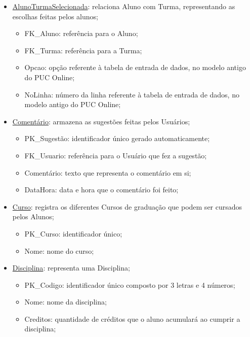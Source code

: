 \documentclass[graduacao,brazil]{ThesisPUC}
\begin{document}
\begin{itemize}
	\item \underline{AlunoTurmaSelecionada}: relaciona Aluno com Turma, representando as escolhas feitas pelos alunos;
	\begin{itemize}
		\item FK\_Aluno: referência para o Aluno;
		\item FK\_Turma: referência para a Turma;
		\item Opcao: opção referente à tabela de entrada de dados, no modelo antigo do PUC Online;
		\item NoLinha: número da linha referente à tabela de entrada de dados, no modelo antigo do PUC Online;
	\end{itemize}

	\item \underline{Comentário}: armazena as sugestões feitas pelos Usuários;
	\begin{itemize}
		\item PK\_Sugestão: identificador único gerado automaticamente;
		\item FK\_Usuario: referência para o Usuário que fez a sugestão;
		\item Comentário: texto que representa o comentário em si;
		\item DataHora: data e hora que o comentário foi feito;
	\end{itemize}

	\item \underline{Curso}: registra os diferentes Cursos de graduação que podem ser cursados pelos Alunos;
	\begin{itemize}
		\item PK\_Curso: identificador único;
		\item Nome: nome do curso;
	\end{itemize}

	\item \underline{Disciplina}: representa uma Disciplina;
	\begin{itemize}
		\item PK\_Codigo: identificador único composto por 3 letras e 4 números;
		\item Nome: nome da disciplina;
		\item Creditos: quantidade de créditos que o aluno acumulará ao cumprir a disciplina;
	\end{itemize}


\end{itemize}
\end{document}
